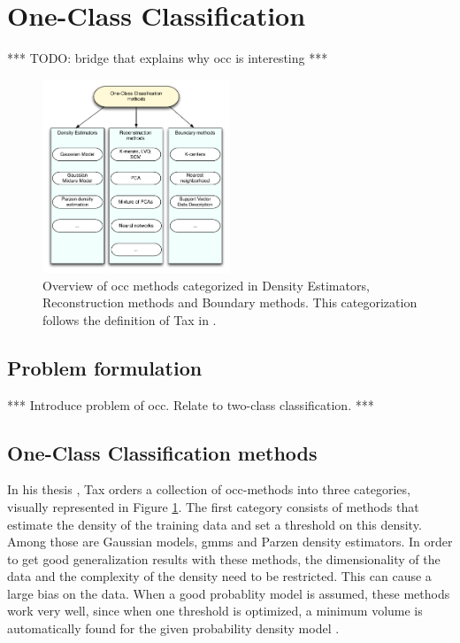 \section{One-Class Classification}\label{sec:one_class_classification}

*** TODO: bridge that explains why \gls{occ} is interesting ***

\begin{figure}
  \centering
    \includegraphics[width=0.5\textwidth,keepaspectratio]{./Figures/chapter3/occ_methods.pdf}
  \caption[\gls{occ} methods]{Overview of \gls{occ} methods categorized in Density Estimators, Reconstruction methods and Boundary methods. This categorization follows the definition of Tax in \cite{tax2001one}.}
  \label{fig:occ-methods}
\end{figure}

\subsection{Problem formulation}\label{subsec:occ-problem-formulation}
*** Introduce problem of \gls{occ}. Relate to two-class classification. ***

\subsection{One-Class Classification methods}\label{subsec:occ-methods}
In his thesis \cite{tax2001one}, Tax orders a collection of \gls{occ}-methods into three categories, visually represented in Figure \ref{fig:occ-methods}.
The first category consists of methods that estimate the density of the training data and set a threshold on this density.
Among those are Gaussian models, \glspl{gmm} and Parzen density estimators.
In order to get good generalization results with these methods, the dimensionality of the data and the complexity of the density need to be restricted.
This can cause a large bias on the data.
When a good probablity model is assumed, these methods work very well, since when one threshold is optimized, a minimum volume is automatically found for the given probability density model \cite{tax2001one}.

